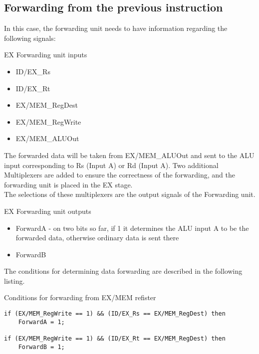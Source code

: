 \documentclass[a4paper,12pt]{report}
\begin{document}
\subsection{Forwarding from the previous instruction}
In this case, the forwarding unit needs to have information regarding the following signals:
\begin{my-list}{EX Forwarding unit inputs}
    \begin{itemize}
        \item ID/EX\_Rs
        \item ID/EX\_Rt
        \item EX/MEM\_RegDest
        \item EX/MEM\_RegWrite
        \item EX/MEM\_ALUOut
    \end{itemize}
\end{my-list}
The forwarded data will be taken from EX/MEM\_ALUOut and sent to the ALU input corresponding to Rs (Input A) or Rd (Input A). Two additional Multiplexers are added to ensure the correctness of the forwarding, and the forwarding unit is placed in the EX stage.\\
The selections of these multiplexers are the output signals of the Forwarding unit.

\begin{my-list}{EX Forwarding unit outputs}
    \begin{itemize}
        \item ForwardA - on two bits so far, if 1 it determines the ALU input A to be the forwarded data, otherwise ordinary data is sent there
        \item ForwardB
    \end{itemize}
\end{my-list}
The conditions for determining data forwarding are described in the following listing.

\begin{my-listing}{Conditions for forwarding from EX/MEM refister}
    \begin{lstlisting}[style=vhdl]
if (EX/MEM_RegWrite == 1) && (ID/EX_Rs == EX/MEM_RegDest) then
    ForwardA = 1;
    
if (EX/MEM_RegWrite == 1) && (ID/EX_Rt == EX/MEM_RegDest) then
    ForwardB = 1;
    \end{lstlisting}
\end{my-listing}
\end{document}
